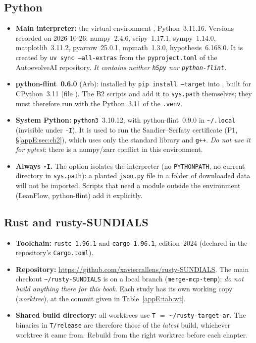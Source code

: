 \subsection{Python}
\begin{itemize}
\item \textbf{Main interpreter:} the virtual environment , Python~3.11.16. Versions
recorded on 2026-10-26: numpy~2.4.6, scipy~1.17.1, sympy~1.14.0, matplotlib~3.11.2, pyarrow~25.0.1, mpmath~1.3.0,
hypothesis~6.168.0. It is created by \texttt{uv sync --all-extras} from the \texttt{pyproject.toml} of the AutoevolveAI
repository. \emph{It contains neither \texttt{h5py} nor \texttt{python-flint}.}
\item \textbf{python-flint~0.6.0} (Arb): installed by \texttt{pip install --target} into ,
built for CPython~3.11 (file ). The B2 scripts and
 add it to \texttt{sys.path} themselves; they must therefore run with the Python~3.11 of
the \texttt{.venv}.
\item \textbf{System Python:} \texttt{python3}~3.10.12, with python-flint~0.9.0 in \texttt{\~{}/.local} (invisible under
\texttt{-I}). It is used to run the Sandier--Serfaty certificate (P1, §\ref{appE:sec:ch2}), which uses only the standard library and \texttt{g++}. \emph{Do not use it for pytest}: there is a numpy/zarr conflict in
this environment.
\item \textbf{Always \texttt{-I}.} The option isolates the interpreter (no \texttt{PYTHONPATH}, no current directory in
\texttt{sys.path}): a planted \texttt{json.py} file in a folder of downloaded data will not be imported. Scripts that
need a module outside the environment (LeanFlow, python-flint) add it explicitly.
\end{itemize}

\subsection{Rust and rusty-SUNDIALS}
\begin{itemize}
\item \textbf{Toolchain:} \texttt{rustc~1.96.1} and \texttt{cargo~1.96.1}, edition~2024 (declared in the repository's
\texttt{Cargo.toml}).
\item \textbf{Repository:} \url{https://github.com/xaviercallens/rusty-SUNDIALS}. The main checkout
\texttt{\~{}/rusty-SUNDIALS} is on a local branch (\texttt{merge-mcp-temp}); \emph{do not build anything there for this
book}. Each study has its own working copy (\emph{worktree}), at the commit given in Table~\ref{appE:tab:wt}.
\item \textbf{Shared build directory:} all worktrees use \texttt{T} $=$ \texttt{\~{}/rusty-target-ar}. The binaries in
\texttt{T/release} are therefore those of the \emph{latest} build, whichever worktree it came from. Rebuild from the
right worktree before each chapter.
\end{itemize}


